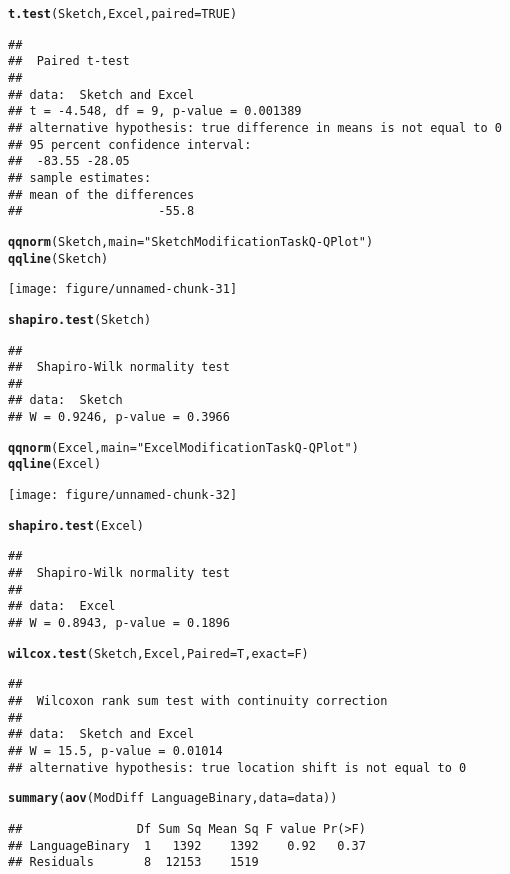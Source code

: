 \documentclass[12pt, twoside, a4paper, openright]{report}\usepackage[]{graphicx}\usepackage[]{color}
\makeatletter
\def\maxwidth{ %
  \ifdim\Gin@nat@width>\linewidth
    \linewidth
  \else
    \Gin@nat@width
  \fi
}
\newcommand{\hlnum}[1]{\textcolor[rgb]{0.686,0.059,0.569}{#1}}%
\newcommand{\hlstr}[1]{\textcolor[rgb]{0.192,0.494,0.8}{#1}}%
\newcommand{\hlopt}[1]{\textcolor[rgb]{0,0,0}{#1}}%
\newcommand{\hlstd}[1]{\textcolor[rgb]{0.345,0.345,0.345}{#1}}%
\newcommand{\hlkwc}[1]{\textcolor[rgb]{0.333,0.667,0.333}{#1}}%
\newcommand{\hlkwd}[1]{\textcolor[rgb]{0.737,0.353,0.396}{\textbf{#1}}}%
\newenvironment{kframe}{%
 \def\at@end@of@kframe{}%
 \ifinner\ifhmode%
  \def\at@end@of@kframe{\end{minipage}}%
  \begin{minipage}{\columnwidth}%
 \fi\fi%
 \def\FrameCommand##1{\hskip\@totalleftmargin \hskip-\fboxsep
 \colorbox{shadecolor}{##1}\hskip-\fboxsep
     \hskip-\linewidth \hskip-\@totalleftmargin \hskip\columnwidth}%
 \MakeFramed {\advance\hsize-\width
   \@totalleftmargin\z@ \linewidth\hsize
   \@setminipage}}%
 {\par\unskip\endMakeFramed%
 \at@end@of@kframe}
\newenvironment{knitrout}{}{} %
\makeatother
\begin{document}
\begin{knitrout}
\color{fgcolor}\begin{kframe}
\begin{alltt}
\hlkwd{t.test}\hlstd{(Sketch, Excel,} \hlkwc{paired} \hlstd{=} \hlnum{TRUE}\hlstd{)}
\end{alltt}
\begin{verbatim}
## 
## 	Paired t-test
## 
## data:  Sketch and Excel
## t = -4.548, df = 9, p-value = 0.001389
## alternative hypothesis: true difference in means is not equal to 0
## 95 percent confidence interval:
##  -83.55 -28.05
## sample estimates:
## mean of the differences 
##                   -55.8
\end{verbatim}
\begin{alltt}
\hlkwd{qqnorm}\hlstd{(Sketch,} \hlkwc{main} \hlstd{=} \hlstr{"Sketch Modification Task Q-Q Plot"}\hlstd{)}
\hlkwd{qqline}\hlstd{(Sketch)}
\end{alltt}
\end{kframe}
\texttt{[image: figure/unnamed-chunk-31]} 
\begin{kframe}\begin{alltt}
\hlkwd{shapiro.test}\hlstd{(Sketch)}
\end{alltt}
\begin{verbatim}
## 
## 	Shapiro-Wilk normality test
## 
## data:  Sketch
## W = 0.9246, p-value = 0.3966
\end{verbatim}
\begin{alltt}
\hlkwd{qqnorm}\hlstd{(Excel,} \hlkwc{main} \hlstd{=} \hlstr{"Excel Modification Task Q-Q Plot"}\hlstd{)}
\hlkwd{qqline}\hlstd{(Excel)}
\end{alltt}
\end{kframe}
\texttt{[image: figure/unnamed-chunk-32]} 
\begin{kframe}\begin{alltt}
\hlkwd{shapiro.test}\hlstd{(Excel)}
\end{alltt}
\begin{verbatim}
## 
## 	Shapiro-Wilk normality test
## 
## data:  Excel
## W = 0.8943, p-value = 0.1896
\end{verbatim}
\begin{alltt}
\hlkwd{wilcox.test}\hlstd{(Sketch, Excel,} \hlkwc{Paired} \hlstd{= T,} \hlkwc{exact} \hlstd{= F)}
\end{alltt}
\begin{verbatim}
## 
## 	Wilcoxon rank sum test with continuity correction
## 
## data:  Sketch and Excel
## W = 15.5, p-value = 0.01014
## alternative hypothesis: true location shift is not equal to 0
\end{verbatim}
\begin{alltt}
\hlkwd{summary}\hlstd{(}\hlkwd{aov}\hlstd{(ModDiff} \hlopt{~} \hlstd{LanguageBinary,} \hlkwc{data} \hlstd{= data))}
\end{alltt}
\begin{verbatim}
##                Df Sum Sq Mean Sq F value Pr(>F)
## LanguageBinary  1   1392    1392    0.92   0.37
## Residuals       8  12153    1519
\end{verbatim}
\end{kframe}
\end{knitrout}
\end{document}

